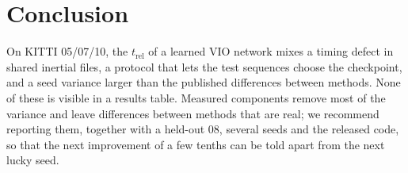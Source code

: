 \documentclass[letterpaper,journal]{IEEEtran}
\newcommand{\trel}{t_{\mathrm{rel}}}
\begin{document}
\section{Conclusion}

On KITTI 05/07/10, the $\trel$ of a learned VIO network mixes a timing defect in shared inertial files, a protocol that lets the test sequences choose the checkpoint, and a seed variance larger than the published differences between methods. None of these is visible in a results table. Measured components remove most of the variance and leave differences between methods that are real; we recommend reporting them, together with a held-out 08, several seeds and the released code, so that the next improvement of a few tenths can be told apart from the next lucky seed.



\end{document}
